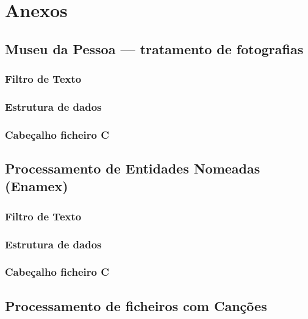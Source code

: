 \chapter{Anexos}
\label{cap:anex}


\section{Museu da Pessoa — tratamento de fotografias}
\label{seq:anex-museu}


\subsection{Filtro de Texto}
\label{seq:anex-museu-filtro}


\subsection{Estrutura de dados}
\label{seq:anex-museu-est}


\subsection{Cabeçalho ficheiro C}
\label{seq:anex-museu-header}


\section{Processamento de Entidades Nomeadas (Enamex)}
\label{seq:anex-enamex}


\subsection{Filtro de Texto}
\label{seq:anex-enamex-filtro}


\subsection{Estrutura de dados}
\label{seq:anex-enamex-est}


\subsection{Cabeçalho ficheiro C}
\label{seq:anex-enamex-header}


\section{Processamento de ficheiros com Canções}
\label{seq:anex-music}


